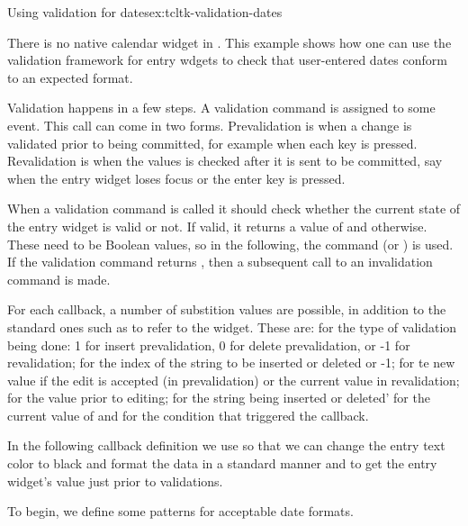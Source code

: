 \begin{example}{Using validation for dates}{ex:tcltk-validation-dates}



There is no native calendar widget in . This example shows how one can use the validation framework for entry wdgets to check that user-entered dates conform to an expected format. 

Validation happens in a few steps.  A validation command is assigned
to some event. This call can come in two forms. Prevalidation is when
a change is validated prior to being committed, for example when each key
is pressed.  Revalidation is when the values is checked
after it is sent to be committed, say when the entry widget loses
focus or the enter key is pressed.

When a validation command is called it should check
whether the current state of the entry widget is valid or not. If
valid, it returns a value of  and 
otherwise. These need to be \TCL\/ Boolean values, so in the following,
the command  (or ) is used. If
the validation command returns , then a subsequent call to
an invalidation command is made.

For each callback, a number of substition values are possible, in addition to the standard ones such as  to refer to the widget. These are:  for the type of validation being done: 1 for insert prevalidation, 0 for delete prevalidation, or -1 for revalidation;  for the index of the string to be inserted or deleted or -1;  for te new value if the edit is accepted (in prevalidation) or the current value in revalidation;  for the value prior to editing;  for the string being inserted or deleted'  for the current value of  and  for the condition that triggered the callback.  

In the following callback definition we use  so that we can change the entry text color to black and format the data in a standard manner and  to get the entry widget's value just prior to validations.


To begin,  we define some patterns for acceptable date formats.
\begin{Schunk}
\end{Schunk}


\end{example}
